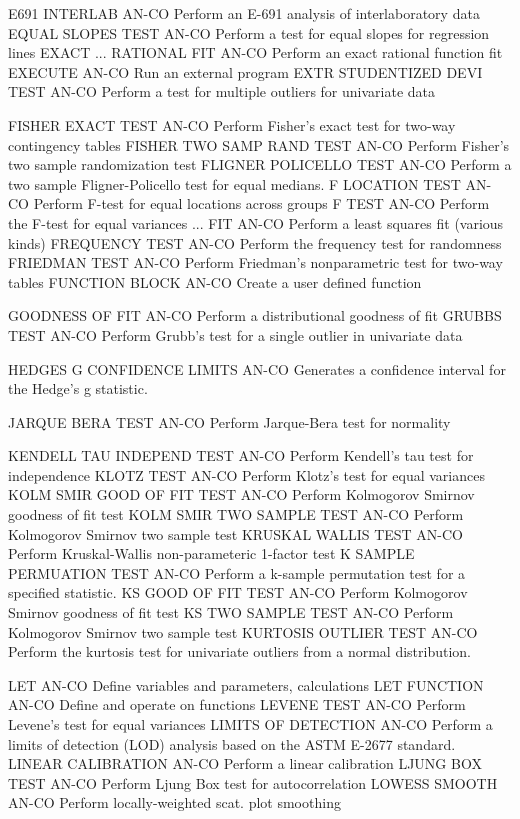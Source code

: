 E691 INTERLAB               AN-CO Perform an E-691 analysis of interlaboratory data
EQUAL SLOPES TEST           AN-CO Perform a test for equal slopes for regression lines
EXACT ... RATIONAL FIT      AN-CO Perform an exact rational function fit
EXECUTE                     AN-CO Run an external program
EXTR STUDENTIZED DEVI TEST  AN-CO Perform a test for multiple outliers for univariate data

FISHER EXACT TEST           AN-CO Perform Fisher's exact test for two-way contingency tables
FISHER TWO SAMP RAND TEST   AN-CO Perform Fisher's two sample randomization test
FLIGNER POLICELLO TEST      AN-CO Perform a two sample Fligner-Policello test for equal medians.
F LOCATION TEST             AN-CO Perform F-test for equal locations across groups
F TEST                      AN-CO Perform the F-test for equal variances
... FIT                     AN-CO Perform a least squares fit (various kinds)
FREQUENCY TEST              AN-CO Perform the frequency test for randomness
FRIEDMAN TEST               AN-CO Perform Friedman's nonparametric test for two-way tables
FUNCTION BLOCK              AN-CO Create a user defined function

GOODNESS OF FIT             AN-CO Perform a distributional goodness of fit
GRUBBS TEST                 AN-CO Perform Grubb's test for a single outlier in univariate data

HEDGES G CONFIDENCE LIMITS  AN-CO Generates a confidence interval for the Hedge's g statistic.

JARQUE BERA TEST            AN-CO Perform Jarque-Bera test for normality

KENDELL TAU INDEPEND TEST   AN-CO Perform Kendell's tau test for independence
KLOTZ TEST                  AN-CO Perform Klotz's test for equal variances
KOLM SMIR GOOD OF FIT TEST  AN-CO Perform Kolmogorov Smirnov goodness of fit test
KOLM SMIR TWO SAMPLE TEST   AN-CO Perform Kolmogorov Smirnov two sample test
KRUSKAL WALLIS TEST         AN-CO Perform Kruskal-Wallis non-parameteric 1-factor test
K SAMPLE PERMUATION TEST    AN-CO Perform a k-sample permutation test for a specified statistic.
KS GOOD OF FIT TEST         AN-CO Perform Kolmogorov Smirnov goodness of fit test
KS TWO SAMPLE TEST          AN-CO Perform Kolmogorov Smirnov two sample test
KURTOSIS OUTLIER TEST       AN-CO Perform the kurtosis test for univariate outliers from a normal distribution.

LET                         AN-CO Define variables and parameters, calculations
LET FUNCTION                AN-CO Define and operate on functions
LEVENE TEST                 AN-CO Perform Levene's test for equal variances
LIMITS OF DETECTION         AN-CO Perform a limits of detection (LOD) analysis based on the ASTM E-2677 standard.
LINEAR CALIBRATION          AN-CO Perform a linear calibration
LJUNG BOX TEST              AN-CO Perform Ljung Box test for autocorrelation
LOWESS SMOOTH               AN-CO Perform locally-weighted scat. plot smoothing

